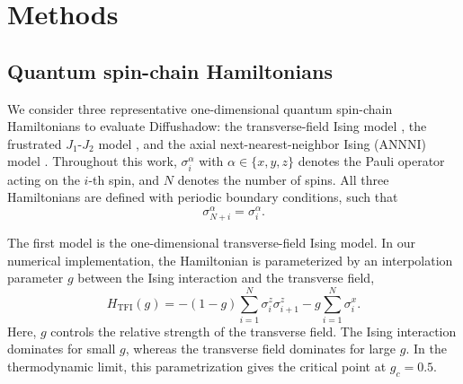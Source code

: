 \documentclass[pdflatex,sn-mathphys-num]{sn-jnl}%
\theoremstyle{thmstyleone}%
\theoremstyle{thmstyletwo}%
\theoremstyle{thmstylethree}%
\begin{document}



\section{Methods}\label{sec11}




\subsection{Quantum spin-chain Hamiltonians}

We consider three representative one-dimensional quantum spin-chain Hamiltonians to evaluate Diffushadow: the transverse-field Ising model \cite{pfeuty1970one}, the frustrated \(J_1\)-\(J_2\) model \cite{majumdar1969next, majumdar1969next2}, and the axial next-nearest-neighbor Ising (ANNNI) model \cite{selke1988annni}. Throughout this work, \(\sigma_i^\alpha\) with \(\alpha \in \{x,y,z\}\) denotes the Pauli operator acting on the \(i\)-th spin, and \(N\) denotes the number of spins. All three Hamiltonians are defined with periodic boundary conditions, such that
\begin{equation}
\sigma_{N+i}^{\alpha} = \sigma_i^{\alpha}.
\end{equation}

The first model is the one-dimensional transverse-field Ising model. In our numerical implementation, the Hamiltonian is parameterized by an interpolation parameter \(g\) between the Ising interaction and the transverse field,
\begin{equation}
H_{\mathrm{TFI}}(g)
=
-(1-g)\sum_{i=1}^{N}\sigma_i^z\sigma_{i+1}^z
-
g\sum_{i=1}^{N}\sigma_i^x .
\label{eq:tfi_hamiltonian}
\end{equation}
Here, \(g\) controls the relative strength of the transverse field. The Ising interaction dominates for small \(g\), whereas the transverse field dominates for large \(g\). In the thermodynamic limit, this parametrization gives the critical point at \(g_c=0.5\).
\end{document}
